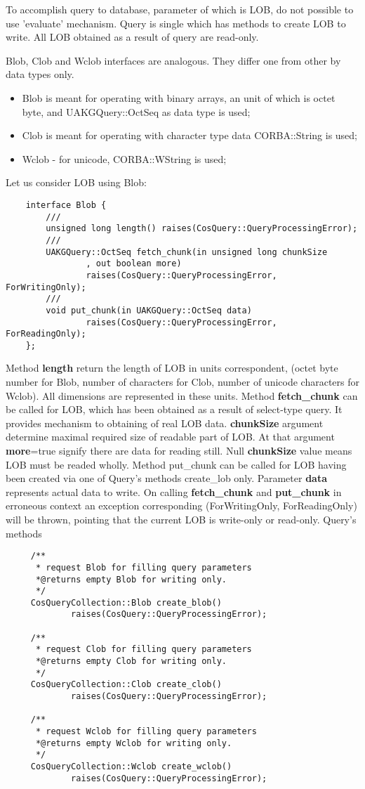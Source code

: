 \documentclass[10pt]{article}
\begin{document}
  To accomplish query to database, parameter of which is LOB, do not possible 
  to use 'evaluate' mechanism. Query is single which has methods to create LOB
  to write. All LOB obtained as a result of query are read-only.

  Blob, Clob and Wclob interfaces are analogous. They differ one from other
  by data types only.
 \begin{itemize}
   \item Blob is meant for operating with binary arrays, an unit of which is octet byte,
         and UAKGQuery::OctSeq as data type is used;
   \item Clob is meant for operating with character type data CORBA::String is used;
   \item Wclob - for unicode, CORBA::WString is used;
 \end{itemize}
  Let us consider LOB using Blob:
\begin{verbatim}
    interface Blob {
        ///
        unsigned long length() raises(CosQuery::QueryProcessingError);
        ///
        UAKGQuery::OctSeq fetch_chunk(in unsigned long chunkSize
                , out boolean more)
                raises(CosQuery::QueryProcessingError, ForWritingOnly);
        ///
        void put_chunk(in UAKGQuery::OctSeq data)
                raises(CosQuery::QueryProcessingError, ForReadingOnly);
    };
\end{verbatim}
  Method {\bf length} return the length of LOB in units correspondent,
  (octet byte number for Blob, number of characters for Clob,
  number of unicode characters for Wclob).
  All dimensions are represented in these units.
  Method {\bf fetch\_chunk} can be called for LOB, which has been obtained as a result
  of select-type query. It provides mechanism to obtaining of real LOB data.
  {\bf chunkSize} argument determine maximal required size of readable part of LOB. 
  At that argument {\bf more}=true signify there are data for reading still.
  Null {\bf chunkSize} value means LOB must be readed wholly.
  Method put\_chunk can be called for LOB having been created via one of Query's
  methods create\_<B|C|Wc>lob only. Parameter {\bf data} represents actual data
  to write.
  On calling {\bf fetch\_chunk} and {\bf put\_chunk} in erroneous context an exception
  corresponding (ForWritingOnly, ForReadingOnly) will be thrown, pointing that the
  current LOB is write-only or read-only.
  Query's methods 
\begin{verbatim}
     /**
      * request Blob for filling query parameters
      *@returns empty Blob for writing only.
      */
     CosQueryCollection::Blob create_blob()
             raises(CosQuery::QueryProcessingError);

     /**
      * request Clob for filling query parameters
      *@returns empty Clob for writing only.
      */
     CosQueryCollection::Clob create_clob()
             raises(CosQuery::QueryProcessingError);

     /**
      * request Wclob for filling query parameters
      *@returns empty Wclob for writing only.
      */
     CosQueryCollection::Wclob create_wclob()
             raises(CosQuery::QueryProcessingError);
\end{verbatim}
\end{document}
